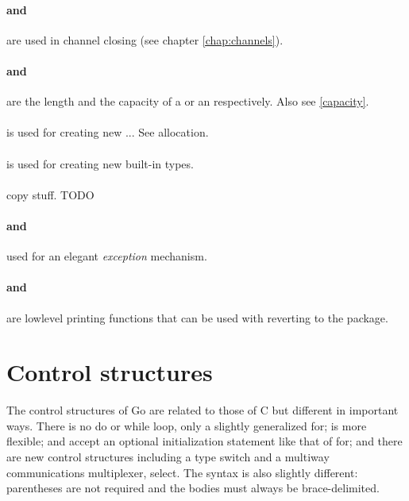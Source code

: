 \paragraph{ and } are used in
channel closing (see chapter \ref{chap:channels}).

\paragraph{ and } are the length and the capacity
of a  or an  respectively. Also see
\ref{capacity}.

\paragraph{} is used for creating new ... See allocation.

\paragraph{} is used for creating new built-in types.

\paragraph{} copy stuff. TODO

\paragraph{ and } used for an elegant \emph{exception} mechanism.

\paragraph{ and } are lowlevel printing
functions that can be used with reverting to the  package.

\section{Control structures}
The control structures of Go are related to those of C but different in
important ways. There is no do or while loop, only a slightly
generalized for;  is more flexible;  and
 accept an
optional initialization statement like that of for; and there are new
control structures including a type switch and a multiway communications
multiplexer, select. The syntax is also slightly different: parentheses
are not required and the bodies must always be brace-delimited.

